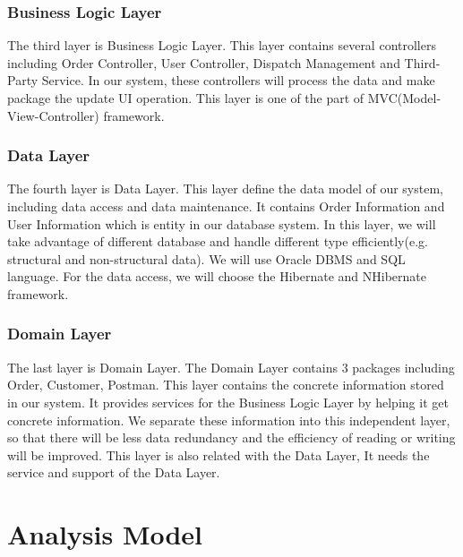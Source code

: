 \documentclass[12pt]{scrreprt}
\begin{document}
\subsubsection{Business Logic Layer}
The third layer is Business Logic Layer. This layer contains several
controllers including Order Controller, User Controller, Dispatch Management and
Third-Party Service. In our system, these controllers will process the data and
make package the update UI operation. This layer is one of the part of
MVC(Model-View-Controller) framework.
\subsubsection{Data Layer}
The fourth layer is Data Layer. This layer define the data model of our system,
including data access and data maintenance. It contains Order Information and
User Information which is entity in our database system. In this layer, we will
take advantage of different database and handle different type efficiently(e.g.
structural and non-structural data). We will use Oracle DBMS and SQL language.
For the data access, we will choose the Hibernate and NHibernate framework.
\subsubsection{Domain Layer}
The last layer is Domain Layer. The Domain Layer contains $3$ packages including
Order, Customer, Postman. This layer contains the concrete information stored
in our system. It provides services for the Business Logic Layer by helping it
get concrete information. We separate these information into this independent
layer, so that there will be less data redundancy and the efficiency of reading
or writing will be improved. This layer is also related with the Data Layer, It
needs the service and support of the Data Layer.
\section{Analysis Model}
\end{document}
